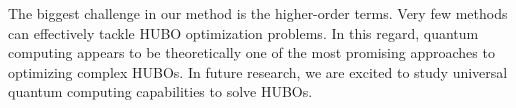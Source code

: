 


The biggest challenge in our method is the higher-order terms. Very few methods can effectively tackle HUBO optimization problems. In this regard, quantum computing appears to be theoretically one of the most promising approaches to optimizing complex HUBOs. In future research, we are excited to study universal quantum computing capabilities to solve HUBOs.


